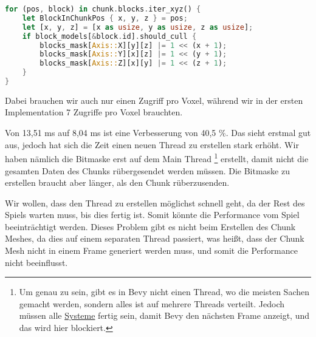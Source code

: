 \begin{lstlisting}[language=Rust]
for (pos, block) in chunk.blocks.iter_xyz() {
	let BlockInChunkPos { x, y, z } = pos;
	let [x, y, z] = [x as usize, y as usize, z as usize];
	if block_models[&block.id].should_cull {
		blocks_mask[Axis::X][y][z] |= 1 << (x + 1);
		blocks_mask[Axis::Y][x][z] |= 1 << (y + 1);
		blocks_mask[Axis::Z][x][y] |= 1 << (z + 1);
	}
}
\end{lstlisting}

Dabei brauchen wir auch nur einen Zugriff pro Voxel,
während wir in der ersten Implementation 7 Zugriffe
pro Voxel brauchten.



\vspace{0.3cm}


\vspace{0.3cm}


Von 13,51 ms auf 8,04 ms ist eine Verbesserung
von 40,5 \%. Das sieht erstmal gut aus,
jedoch hat sich die Zeit einen neuen Thread zu
erstellen stark erhöht. Wir haben nämlich die Bitmaske
erst auf dem Main Thread
\footnote{Um genau zu sein, gibt es in Bevy
nicht einen  Thread, wo die meisten Sachen
gemacht werden, sondern alles ist auf mehrere Threads
verteilt. Jedoch müssen alle
\href{https://bevy-cheatbook.github.io/programming/systems.html}{Systeme}
fertig sein, damit Bevy den nächsten Frame anzeigt,
und das wird hier blockiert.}
erstellt, damit nicht die
gesamten Daten des Chunks rübergesendet werden müssen.
Die Bitmaske zu erstellen braucht aber länger,
als den Chunk rüberzusenden.

Wir wollen, dass den Thread zu erstellen möglichst
schnell geht, da der Rest des Spiels warten muss,
bis dies fertig ist. Somit könnte die Performance
vom Spiel beeinträchtigt werden. Dieses Problem gibt
es nicht beim Erstellen des Chunk Meshes, da dies auf
einem separaten Thread passiert, was heißt, dass der
Chunk Mesh nicht in einem Frame generiert werden muss,
und somit die Performance nicht beeinflusst.


